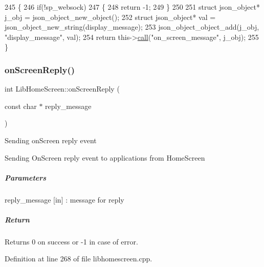 \begin{DoxyCode}
245 \{
246     \textcolor{keywordflow}{if}(!sp\_websock)
247     \{
248         \textcolor{keywordflow}{return} -1;
249     \}
250 
251     \textcolor{keyword}{struct }json\_object* j\_obj = json\_object\_new\_object();
252     \textcolor{keyword}{struct }json\_object* val = json\_object\_new\_string(display\_message);
253     json\_object\_object\_add(j\_obj, \textcolor{stringliteral}{"display\_message"}, val);
254     \textcolor{keywordflow}{return} this->\hyperlink{class_lib_home_screen_a527b49dcfe581be6275d0eb2236ba37f}{call}(\textcolor{stringliteral}{"on\_screen\_message"}, j\_obj);
255 \}
\end{DoxyCode}
\mbox{\label{class_lib_home_screen_a6c065f41f2c5d1f58d2763bfb4da9c37}} 
\subsubsection{\texorpdfstring{on\+Screen\+Reply()}{onScreenReply()}}
{\footnotesize\ttfamily int Lib\+Home\+Screen\+::on\+Screen\+Reply (\begin{DoxyParamCaption}\item[{const char $\ast$}]{reply\+\_\+message }\end{DoxyParamCaption})}

Sending on\+Screen reply event

Sending On\+Screen reply event to applications from Home\+Screen

\subparagraph*{Parameters}


\begin{DoxyItemize}
\item reply\+\_\+message \mbox{[}in\mbox{]} \+: message for reply
\end{DoxyItemize}

\subparagraph*{Return}


\begin{DoxyItemize}
\item Returns 0 on success or -\/1 in case of error. 
\end{DoxyItemize}

Definition at line 268 of file libhomescreen.\+cpp.


